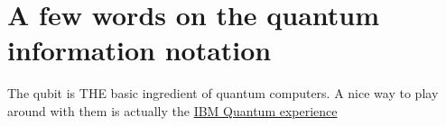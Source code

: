 \section{A few words on the quantum information notation}

The qubit is THE basic ingredient of quantum computers. A nice way to play around with them is actually the \href{http://}{IBM Quantum experience}